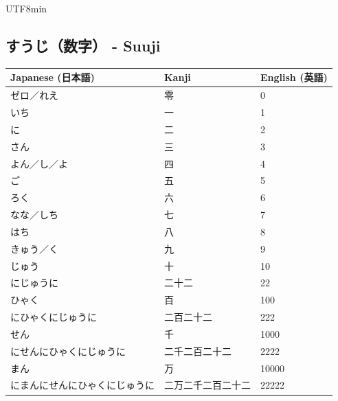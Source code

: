 \documentclass[11pt]{article}
\begin{document}
\begin{CJK}{UTF8}{min}
\subsection{すうじ（数字） - Suuji}
\begin{tabularx}{\textwidth}{X | X | X}
    \toprule
    \textbf{Japanese (日本語)} & \textbf{Kanji} & \textbf{English (英語)} \\
    \midrule
    ゼロ／れえ & 零 & 0 \\
    いち & 一 & 1 \\
    に & 二 & 2 \\
    さん & 三 & 3 \\
    よん／し／よ & 四 & 4 \\
    ご & 五 & 5 \\
    ろく & 六 & 6 \\
    なな／しち & 七 & 7 \\
    はち & 八 & 8 \\
    きゅう／く & 九 & 9 \\
    じゅう & 十 & 10 \\
    にじゅうに & 二十二 & 22 \\
    ひゃく & 百 & 100 \\
    にひゃくにじゅうに & 二百二十二 & 222 \\
    せん & 千 & 1000 \\
    にせんにひゃくにじゅうに & 二千二百二十二 & 2222 \\
    まん & 万 & 10000 \\
    にまんにせんにひゃくにじゅうに & 二万二千二百二十二 & 22222 \\
    \bottomrule
\end{tabularx}


\end{CJK}
\end{document}
